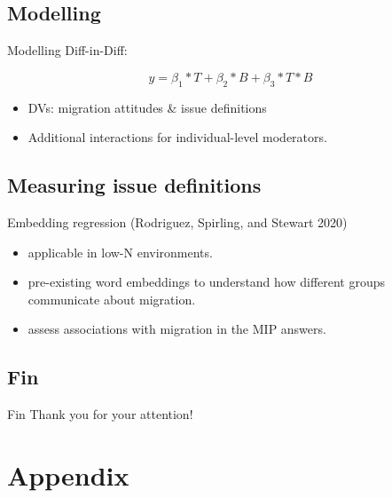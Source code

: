 \documentclass[
  ignorenonframetext,
]{beamer}
\providecommand{\tightlist}{%
  \setlength{\itemsep}{0pt}\setlength{\parskip}{0pt}}
\begin{document}
\hypertarget{modelling}{%
\subsection{Modelling}\label{modelling}}

\begin{frame}{Modelling}
Diff-in-Diff:

\center

\[ y = \beta_1 * T + \beta_2 * B + \beta_3 * T * B \]

\begin{itemize}
\tightlist
\item
  DVs: migration attitudes \& issue definitions
\item
  Additional interactions for individual-level moderators.
\end{itemize}
\end{frame}

\hypertarget{measuring-issue-definitions}{%
\subsection{Measuring issue
definitions}\label{measuring-issue-definitions}}

\begin{frame}{Embedding regression (Rodriguez, Spirling, and Stewart
2020)}
\protect\hypertarget{embedding-regression-rodriguez2020}{}
\begin{itemize}
\tightlist
\item
  applicable in low-N environments.
\item
  pre-existing word embeddings to understand how different groups
  communicate about migration.
\item
  assess associations with migration in the MIP answers.
\end{itemize}
\end{frame}

\hypertarget{fin}{%
\subsection{Fin}\label{fin}}

\begin{frame}{Fin}
\center \Large Thank you for your attention!
\end{frame}

\hypertarget{appendix}{%
\section{Appendix}\label{appendix}}
\end{document}
